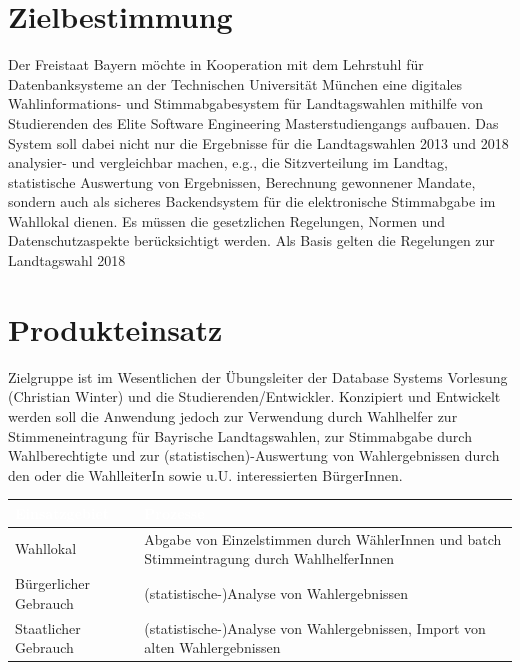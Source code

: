 \documentclass[a4paper,12pt]{article}
\begin{document}
 \setcounter{page}{2}
 \tableofcontents          %
 \clearpage
 
\section{Zielbestimmung}
Der Freistaat Bayern möchte in Kooperation mit dem Lehrstuhl für 
Datenbanksysteme an der Technischen Universität München eine digitales 
Wahlinformations- und Stimmabgabesystem für Landtagswahlen mithilfe von 
Studierenden des Elite Software Engineering Masterstudiengangs aufbauen.
%
Das System soll dabei nicht nur die Ergebnisse für die Landtagswahlen 
2013 und 2018 analysier- und vergleichbar machen, e.g., die Sitzverteilung 
im Landtag, statistische Auswertung von Ergebnissen, Berechnung gewonnener
Mandate, sondern auch als sicheres Backendsystem für die elektronische 
Stimmabgabe im Wahllokal dienen. 
%
Es müssen die gesetzlichen Regelungen, Normen und Datenschutzaspekte
berücksichtigt werden. Als Basis gelten die Regelungen zur
Landtagswahl 2018

\section{Produkteinsatz}
Zielgruppe ist im Wesentlichen der Übungsleiter der Database Systems 
Vorlesung (Christian Winter) und die Studierenden/Entwickler. 
%
Konzipiert und Entwickelt werden soll die Anwendung jedoch zur Verwendung 
durch Wahlhelfer zur Stimmeneintragung für Bayrische Landtagswahlen, 
zur Stimmabgabe durch Wahlberechtigte und zur (statistischen)-Auswertung
von Wahlergebnissen durch den oder die WahlleiterIn sowie u.U. 
interessierten BürgerInnen.

\begin{center}
\begin{tabular}{|m{5cm}|m{10cm}|}
	\hline
  \rowcolor{Blue} \textcolor{white}{\textbf{Einsatzgebiet}} & \textcolor{white}{\textbf{Prozesse}} \\
  \hline
  Wahllokal & Abgabe von Einzelstimmen durch WählerInnen und batch Stimmeintragung durch WahlhelferInnen \\
	\hline
  Bürgerlicher Gebrauch & (statistische-)Analyse von Wahlergebnissen \\
  \hline
  Staatlicher Gebrauch & (statistische-)Analyse von Wahlergebnissen, Import von alten Wahlergebnissen \\
	\hline
\end{tabular}
\end{center}
\end{document}
